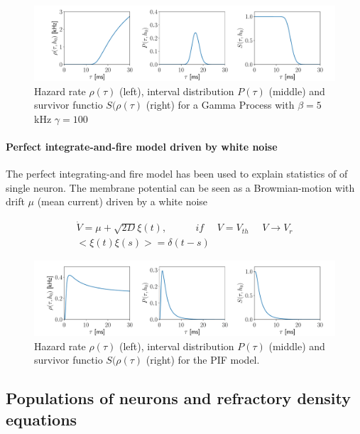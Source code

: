 \documentclass[a4paper,11pt,twoside]{article}
\numberwithin{equation}{section}
\begin{document}
\begin{figure}
	\includegraphics[width=\linewidth]{gamma.pdf}
	\caption{Hazard rate $\rho(\tau)$ (left), interval distribution $P(\tau)$ (middle) and survivor functio $S(\rho(\tau)$ (right) for a Gamma Process with $\beta=5$kHz
		$\gamma=100$ }
	\label{fig:gammaprocess}
\end{figure}

\paragraph{Perfect integrate-and-fire model driven by white noise}
\label{sec:pif}
The perfect integrating-and fire model has been used  to explain statistics of of single neuron. The membrane potential can be seen as a Browmian-motion with drift $\mu$ (mean current) driven by a white noise


\begin{align}
\label{eq:Vxi}
\dot V=\mu +\sqrt{2D}\xi(t), \:\:\:\:\:\:\:\: \:\:\:\:\: if\:\:\:\:\:\:  V=V_{th}\:\:\:\:\:\:V\rightarrow V_r\\ 
<\xi(t)\xi(s)>=\delta(t-s)
\end{align}


\begin{figure}
	
	\includegraphics[width=\linewidth]{inversegaussian.pdf}
	\caption{Hazard rate $\rho(\tau)$ (left), interval distribution $P(\tau)$ (middle) and survivor functio $S(\rho(\tau)$ (right) for the PIF model.
	}
	\label{fig:inversegaussianprocess}
\end{figure}



\subsection{Populations of neurons and refractory density equations}
\end{document}
